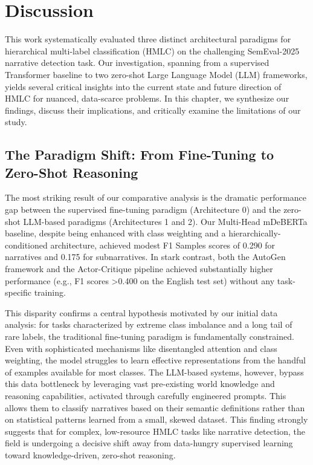 \chapter{Discussion}

This work systematically evaluated three distinct architectural paradigms for hierarchical multi-label classification (HMLC) on the challenging SemEval-2025 narrative detection task. Our investigation, spanning from a supervised Transformer baseline to two zero-shot Large Language Model (LLM) frameworks, yields several critical insights into the current state and future direction of HMLC for nuanced, data-scarce problems. In this chapter, we synthesize our findings, discuss their implications, and critically examine the limitations of our study.

\section{The Paradigm Shift: From Fine-Tuning to Zero-Shot Reasoning}

The most striking result of our comparative analysis is the dramatic performance gap between the supervised fine-tuning paradigm (Architecture 0) and the zero-shot LLM-based paradigms (Architectures 1 and 2). Our Multi-Head mDeBERTa baseline, despite being enhanced with class weighting and a hierarchically-conditioned architecture, achieved modest F1 Samples scores of 0.290 for narratives and 0.175 for subnarratives. In stark contrast, both the AutoGen framework and the Actor-Critique pipeline achieved substantially higher performance (e.g., F1 scores >0.400 on the English test set) without any task-specific training.

This disparity confirms a central hypothesis motivated by our initial data analysis: for tasks characterized by extreme class imbalance and a long tail of rare labels, the traditional fine-tuning paradigm is fundamentally constrained. Even with sophisticated mechanisms like disentangled attention and class weighting, the model struggles to learn effective representations from the handful of examples available for most classes. The LLM-based systems, however, bypass this data bottleneck by leveraging vast pre-existing world knowledge and reasoning capabilities, activated through carefully engineered prompts. This allows them to classify narratives based on their semantic definitions rather than on statistical patterns learned from a small, skewed dataset. This finding strongly suggests that for complex, low-resource HMLC tasks like narrative detection, the field is undergoing a decisive shift away from data-hungry supervised learning toward knowledge-driven, zero-shot reasoning.

